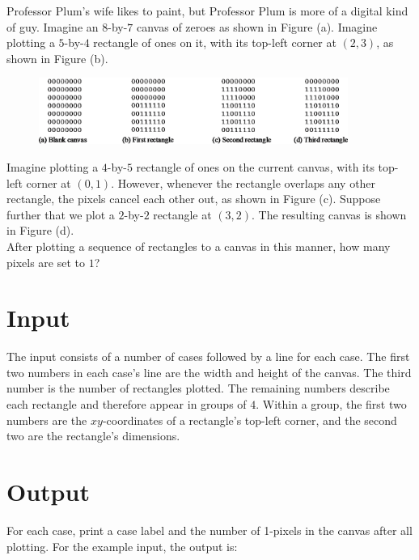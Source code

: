 
Professor Plum’s wife likes to paint, but Professor Plum is more of a digital kind of guy.  Imagine an $8$-by-$7$ canvas of zeroes as shown in Figure (a). Imagine plotting a $5$-by-$4$ rectangle of ones on it, with its top-left corner at $(2, 3)$, as shown in Figure (b).

\begin{figure}[h]
\begin{center}
\includegraphics[width=0.9\textwidth]{problem7chart.png} 
\end{center}
\end{figure}

Imagine plotting a $4$-by-$5$ rectangle of ones on the current canvas, with its top-left corner at $(0, 1)$. However, whenever the rectangle overlaps any other rectangle, the pixels cancel each other out, as shown in Figure (c). Suppose further that we plot a $2$-by-$2$ rectangle at $(3, 2)$. The resulting canvas is shown in Figure (d). \\

After plotting a sequence of rectangles to a canvas in this manner, how many pixels are set to $1$?

\section*{Input}
The input consists of a number of cases followed by a line for each case. The first two numbers in each case’s line are the width and height of the canvas. The third number is the number of rectangles plotted. The remaining numbers describe each rectangle and therefore appear in groups of $4$. Within a group, the first two numbers are the $xy$-coordinates of a rectangle’s top-left corner, and the second two are the rectangle’s dimensions.

\section*{Output}
For each case, print a case label and the number of 1-pixels in the canvas after all plotting. For the example input, the output is: